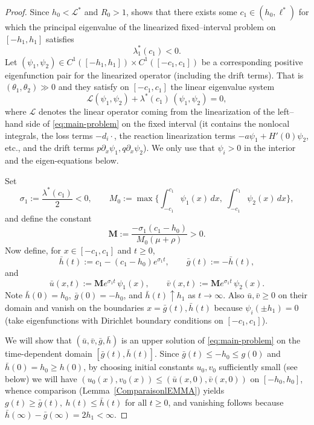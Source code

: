 \documentclass[a4paper,11pt]{amsart}
\theoremstyle{definition}
\numberwithin{equation}{section}
\theoremstyle{definition}
\begin{document}
\begin{proof}
Since $h_0<\mathcal L^\ast$ and $R_0>1$, shows that there exists some \(c_1\in(h_0,\ell^\ast)\) for which the principal eigenvalue of the linearized fixed–interval problem on \([-h_1,h_1]\) satisfies
\[
\lambda^\ast_1(c_1)<0.
\]
Let \((\psi_1,\psi_2)\in C^1([-h_1,h_1])\times C^1([-c_1,c_1])\) be a corresponding positive eigenfunction pair for the linearized operator (including the drift terms). That is \((\theta_1,\theta_2)\gg 0\) and they satisfy on \([-c_1,c_1]\) the linear eigenvalue system
\[
\mathscr L(\psi_1,\psi_2) + \lambda^\ast(c_1)\,(\psi_1,\psi_2) = 0,
\]
where \(\mathscr L\) denotes the linear operator coming from the linearization of the left–hand side of \eqref{eq:main-problem} on the fixed interval (it contains the nonlocal integrals, the loss terms \(-d_i\cdot\), the reaction linearization terms \( -a \psi_1 + H'(0)\psi_2\), etc., and the drift terms \(p\partial_x\psi_1, q\partial_x\psi_2\)). We only use that \(\psi_i>0\) in the interior and the eigen-equations below.

Set
\[
\sigma_1 := \frac{\lambda^\ast(c_1)}{2} < 0,
\qquad
M_0 := \max\Big\{\int_{-c_1}^{c_1}\psi_1(x)\,dx,\;\int_{-c_1}^{c_1}\psi_2(x)\,dx\Big\},
\]
and define the constant
\begin{equation}\label{MMEQ1}
\mathbf{M} := \frac{-\sigma_1 (c_1-h_0)}{M_0(\mu+\rho)} > 0.
\end{equation}
Now define, for \(x\in[-c_1,c_1]\) and \(t\geq0\),
\[
\bar h(t) := c_1 - (c_1-h_0)e^{\sigma_1 t},\qquad \bar g(t) := -\bar h(t),
\]
and
\[
\bar u(x,t) := \mathbf{M} e^{\sigma_1 t}\,\psi_1(x),\qquad
\bar v(x,t) := \mathbf{M} e^{\sigma_1 t}\,\psi_2(x).
\]
Note \(\bar h(0)=h_0,\ \bar g(0)=-h_0\), and \(\bar h(t)\uparrow h_1\) as \(t\to\infty\). Also \(\bar u,\bar v\ge0\) on their domain and vanish on the boundaries \(x=\bar g(t),\bar h(t)\) because \(\psi_i(\pm h_1)=0\) (take eigenfunctions with Dirichlet boundary conditions on \([-c_1,c_1]\)).

We will show that \((\bar u,\bar v,\bar g,\bar h)\) is an upper solution of \eqref{eq:main-problem} on the time-dependent domain \([\bar g(t),\bar h(t)]\). Since \(\bar g(t)\leq -h_0\leq g(0)\) and \(\bar h(0)=h_0\geq h(0)\), by choosing initial constants \(u_0,v_0\) sufficiently small (see below) we will have \((u_0(x),v_0(x))\le(\bar u(x,0),\bar v(x,0))\) on \([-h_0,h_0]\), whence comparison (Lemma~\eqref{ComparaisonlEMMA}) yields \(g(t)\geq\bar g(t),\ h(t)\leq\bar h(t)\) for all \(t\geq0\), and vanishing follows because \(\bar h(\infty)-\bar g(\infty)=2h_1<\infty\).


\end{proof}
\end{document}
